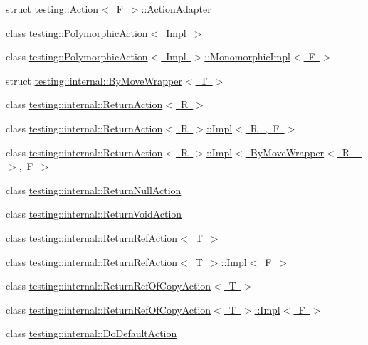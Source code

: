 \begin{DoxyCompactItemize}
\item 
struct \mbox{\hyperlink{structtesting_1_1_action_1_1_action_adapter}{testing\+::\+Action$<$ F $>$\+::\+Action\+Adapter}}
\item 
class \mbox{\hyperlink{classtesting_1_1_polymorphic_action}{testing\+::\+Polymorphic\+Action$<$ Impl $>$}}
\item 
class \mbox{\hyperlink{classtesting_1_1_polymorphic_action_1_1_monomorphic_impl}{testing\+::\+Polymorphic\+Action$<$ Impl $>$\+::\+Monomorphic\+Impl$<$ F $>$}}
\item 
struct \mbox{\hyperlink{structtesting_1_1internal_1_1_by_move_wrapper}{testing\+::internal\+::\+By\+Move\+Wrapper$<$ T $>$}}
\item 
class \mbox{\hyperlink{classtesting_1_1internal_1_1_return_action}{testing\+::internal\+::\+Return\+Action$<$ R $>$}}
\item 
class \mbox{\hyperlink{classtesting_1_1internal_1_1_return_action_1_1_impl}{testing\+::internal\+::\+Return\+Action$<$ R $>$\+::\+Impl$<$ R\+\_\+, F $>$}}
\item 
class \mbox{\hyperlink{classtesting_1_1internal_1_1_return_action_1_1_impl_3_01_by_move_wrapper_3_01_r___01_4_00_01_f_01_4}{testing\+::internal\+::\+Return\+Action$<$ R $>$\+::\+Impl$<$ By\+Move\+Wrapper$<$ R\+\_\+ $>$, F $>$}}
\item 
class \mbox{\hyperlink{classtesting_1_1internal_1_1_return_null_action}{testing\+::internal\+::\+Return\+Null\+Action}}
\item 
class \mbox{\hyperlink{classtesting_1_1internal_1_1_return_void_action}{testing\+::internal\+::\+Return\+Void\+Action}}
\item 
class \mbox{\hyperlink{classtesting_1_1internal_1_1_return_ref_action}{testing\+::internal\+::\+Return\+Ref\+Action$<$ T $>$}}
\item 
class \mbox{\hyperlink{classtesting_1_1internal_1_1_return_ref_action_1_1_impl}{testing\+::internal\+::\+Return\+Ref\+Action$<$ T $>$\+::\+Impl$<$ F $>$}}
\item 
class \mbox{\hyperlink{classtesting_1_1internal_1_1_return_ref_of_copy_action}{testing\+::internal\+::\+Return\+Ref\+Of\+Copy\+Action$<$ T $>$}}
\item 
class \mbox{\hyperlink{classtesting_1_1internal_1_1_return_ref_of_copy_action_1_1_impl}{testing\+::internal\+::\+Return\+Ref\+Of\+Copy\+Action$<$ T $>$\+::\+Impl$<$ F $>$}}
\item 
class \mbox{\hyperlink{classtesting_1_1internal_1_1_do_default_action}{testing\+::internal\+::\+Do\+Default\+Action}}

\end{DoxyCompactItemize}
